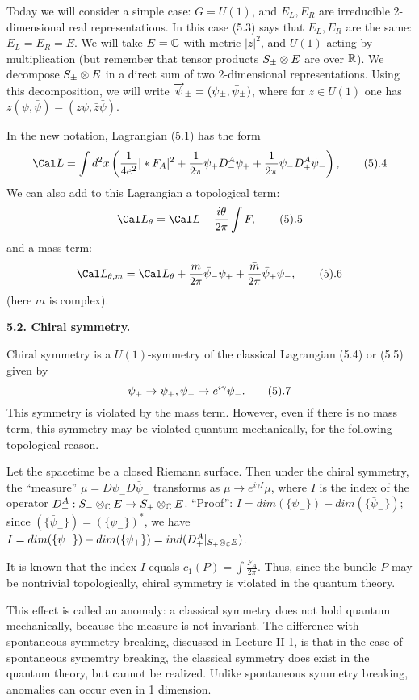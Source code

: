 Today we will consider a simple case: $G=U(1)$, and $E_L,E_R$ are irreducible 
2-dimensional real representations. In this case (5.3) says that 
$E_L,E_R$ are the same: $E_L=E_R=E$. We will take $E=\Bbb C$
with metric $|z|^2$, and $U(1)$ acting
by multiplication (but remember that tensor products 
$S_\pm\otimes E$ are over $\Bbb R$). We 
decompose $S_\pm\otimes E$ in  a direct sum of two 
2-dimensional representations. Using this decomposition, we will write 
 $\overrightarrow{\psi}_\pm=(\psi_\pm,\bar\psi_\pm)$, where
for $z\in U(1)$ one has $z(\psi,\bar\psi)=(z\psi,\bar z\bar\psi)$.

In the new notation, Lagrangian (5.1) has the form
$$
\Cal L=\int d^2x\left(\frac{1}{4e^2}|*F_A|^2+\frac{1}{2\pi}
\bar\psi_+D_-^A\psi_+
+\frac{1}{2\pi}\bar\psi_-D_+^A\psi_-\right),\tag 5.4
$$
We can also add to this Lagrangian a topological term:
$$
\Cal L_\theta=\Cal L-\frac{i\theta}{2\pi}\int F,\tag 5.5
$$
and a mass term:
$$
\Cal L_{\theta,m}=\Cal L_\theta+\frac{m}{2\pi}\bar\psi_-\psi_++
\frac{\bar m}{2\pi}\bar\psi_+\psi_-,
\tag 5.6
$$
(here $m$ is complex). 

{\bf 5.2. Chiral symmetry.} 

Chiral symmetry is a $U(1)$-symmetry of the classical Lagrangian (5.4) or (5.5)
given by
$$
\psi_+\to \psi_+,\psi_-\to e^{i\gamma}\psi_-.\tag 5.7
$$
This symmetry is violated by the mass term. However, even if there is
no mass term, this symmetry may be violated quantum-mechanically, for the 
following topological reason.

Let the spacetime be a closed Riemann surface. Then 
 under the chiral symmetry, 
the ``measure'' $\mu=D\psi_-D\bar \psi_-$ transforms as  
$\mu\to e^{i\gamma I}\mu$, where $I$ is the index of the operator $D_+^A:
S_-\otimes_{\Bbb C} E\to S_+\otimes_\Bbb C E$. ``Proof'': $I=dim(\{\psi_-\})-dim
(\{\bar\psi_-\})$; since $(\{\bar\psi_-\})=(\{\psi_-\})^*$, 
we have $I=dim(\{\psi_-\})-dim
(\{\psi_+\})=ind(D_+^A|_{S_+\otimes_{\Bbb C}E})$.

It is known that the index $I$ equals $c_1(P)=\int \frac{F_A}{2\pi}$. 
Thus, since the bundle $P$ may be nontrivial topologically, chiral symmetry 
is violated in the quantum theory. 

This effect is called an anomaly: a classical symmetry 
does not hold quantum mechanically, because the measure is not invariant. 
The difference with spontaneous symmetry breaking, discussed in 
Lecture II-1, is that in the case of spontaneous symemtry breaking, 
the classical symmetry does exist in the quantum theory, but cannot be
realized. Unlike spontaneous symmetry breaking, 
anomalies can occur even in 1 dimension. 

